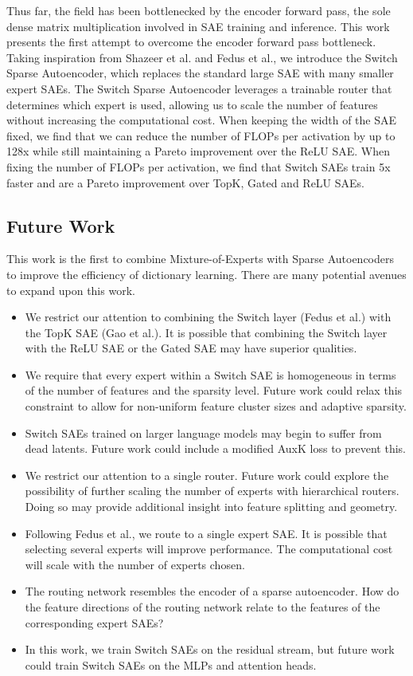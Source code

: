 \documentclass{article} %
\begin{document}
Thus far, the field has been bottlenecked by the encoder forward pass, the sole dense matrix multiplication involved in SAE training and inference. This work presents the first attempt to overcome the encoder forward pass bottleneck. Taking inspiration from Shazeer et al. and Fedus et al., we introduce the Switch Sparse Autoencoder, which replaces the standard large SAE with many smaller expert SAEs. The Switch Sparse Autoencoder leverages a trainable router that determines which expert is used, allowing us to scale the number of features without increasing the computational cost. When keeping the width of the SAE fixed, we find that we can reduce the number of FLOPs per activation by up to 128x while still maintaining a Pareto improvement over the ReLU SAE. When fixing the number of FLOPs per activation, we find that Switch SAEs train 5x faster and are a Pareto improvement over TopK, Gated and ReLU SAEs.

\subsection{Future Work}
This work is the first to combine Mixture-of-Experts with Sparse Autoencoders to improve the efficiency of dictionary learning. There are many potential avenues to expand upon this work.

\begin{itemize}
    \item We restrict our attention to combining the Switch layer (Fedus et al.) with the TopK SAE (Gao et al.). It is possible that combining the Switch layer with the ReLU SAE or the Gated SAE may have superior qualities.
    \item We require that every expert within a Switch SAE is homogeneous in terms of the number of features and the sparsity level. Future work could relax this constraint to allow for non-uniform feature cluster sizes and adaptive sparsity.
    \item Switch SAEs trained on larger language models may begin to suffer from dead latents. Future work could include a modified AuxK loss to prevent this.
    \item We restrict our attention to a single router. Future work could explore the possibility of further scaling the number of experts with hierarchical routers. Doing so may provide additional insight into feature splitting and geometry.
    \item Following Fedus et al., we route to a single expert SAE. It is possible that selecting several experts will improve performance. The computational cost will scale with the number of experts chosen.
    \item The routing network resembles the encoder of a sparse autoencoder. How do the feature directions of the routing network relate to the features of the corresponding expert SAEs?
    \item In this work, we train Switch SAEs on the residual stream, but future work could train Switch SAEs on the MLPs and attention heads.
\end{itemize}
\end{document}
